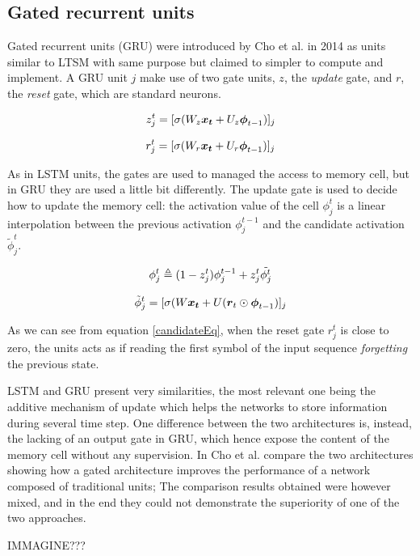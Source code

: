  
\subsection{Gated recurrent units}

Gated recurrent units (GRU) were introduced by Cho et al. in 2014 \cite{gru} as units similar to LTSM with same purpose 
but claimed to simpler to compute and implement. A GRU unit $j$ make use of two gate units, $z$, the 
\textit{update} gate, and $r$, the \textit{reset} gate, which are standard neurons.

\begin{equation}
 z_j^t = [\sigma(W_z\boldsymbol{x_t} + U_z\boldsymbol{\phi}_{t-1})]_j
\end{equation}

\begin{equation}
 r_j^t = [\sigma(W_r\boldsymbol{x_t} + U_r\boldsymbol{\phi}_{t-1})]_j
\end{equation}

As in LSTM units, the gates are used to managed the access to memory cell, but in GRU they are used a little bit 
differently. The update gate is used to decide how to update the memory cell: the activation value of the cell 
$\phi_j^{t}$ is a linear interpolation between the previous activation $\phi_j^{t-1}$ and the candidate activation 
$\tilde{\phi}_j^t$.

\begin{equation}
 \phi_j^t \triangleq (1-z_j^t)\phi_j^{t-1} + z_j^t\tilde{\phi^t_j}
\end{equation}

\begin{equation}
 \tilde{\phi}_j^t = [\sigma(W\boldsymbol{x_t} + U(\boldsymbol{r}_t \odot \boldsymbol{\phi}_{t-1})]_j
 \label{candidateEq}
\end{equation}

As we can see from equation \ref{candidateEq}, when the reset gate $r_j^t$ is close to zero, the units acts as if 
reading the first symbol of the input sequence \textit{forgetting} the previous state.


LSTM and GRU present very similarities, the most relevant one being the additive mechanism of update which helps the 
networks to store information during several time step. One difference between the two architectures is, instead, the 
lacking of an output gate in GRU, which hence expose the content of the memory cell without any supervision. In 
\cite{gru_lstm_empirical} Cho et al. compare the two architectures showing how a gated architecture improves the 
performance of a network composed of traditional units; The comparison results obtained were however mixed, and in the 
end they could not demonstrate the superiority of one of the two approaches.


IMMAGINE???